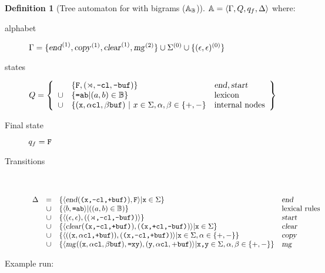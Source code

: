 \documentclass[12pt]{article}
\theoremstyle{definition}
\newtheorem{definition}{Definition}[section]
\begin{document}
\begin{definition}[Tree automaton for \OURG with bigrams \BIGR ($\mathbb{A_{\mathbb{B}}}$)]
  $\mathbb{A} = \langle \Gamma, Q, q_f, \Delta\rangle$ where:
  \begin{description}

    
  \item[alphabet] $\Gamma = \{\text{\textsl{end}}^{(1)},\text{\textsl{copy}}^{(1)},\text{\textsl{clear}}^{(1)},\text{\textsl{mg}}^{(2)}\}\cup\Sigma^{(0)}\cup\{(\epsilon,\epsilon)^{(0)}\}$
    
  \item[states]
    $Q = \left\{
    \begin{array}[H]{c l l}
      & \{\fea{F} , (\LBOUND,\fea{-cl},\fea{-buf})\} & \ed, \start\\
    \cup & \{\fea{=ab} | (a,b)\in\BIGR \} & \text{lexicon}\\
    \cup & \{(\fea{x},\alpha\fea{cl}, \beta\fea{buf}) ~|~  x\in\sg, \alpha,\beta\in\{+,-\}& \text{internal nodes}\\
    \end{array}
\right\}$

  
  \item[Final state] $q_f=\text{\texttt{F}}$

  
  \item[Transitions]\

    $
  \begin{array}[H]{r c l l}
    \Delta & = & \{\la \ed(\fea{(x,-cl,+buf)}), \fea{F}\ra | \fea{x}\in\sg\} & \ed\\
           & \cup & \{\la b, \fea{=ab}\ra | ((a,b)\in\BIGR)\}& \text{lexical rules}\\
           & \cup & \{\la (\emp,\emp),((\fea{\LBOUND,-cl,-buf)}) \ra\}& \start\\
           & \cup & \{\la \cl(\fea{(x,-cl,+buf)}), (\fea{(x,+cl,-buf)})\ra | \fea{x}\in\sg\} & \cl\\
           & \cup & \{\la ((\fea{x},\alpha\fea{cl,+buf})), (\fea{(x,-cl,+buf)}) \ra | \fea{x}\in\sg, \alpha\in\{+,-\} \} & \cp\\
           & \cup & \{\la \mg((\fea{x},\alpha\fea{cl},\beta\fea{buf}), \fea{=xy}),(\fea{y},\alpha\fea{cl},+\fea{buf})\ra | \fea{x,y}\in\sg, \alpha,\beta\in\{+,-\} \} & \mg\\
  \end{array}
  $
\end{description}


  
\end{definition}


Example run:
\end{document}
